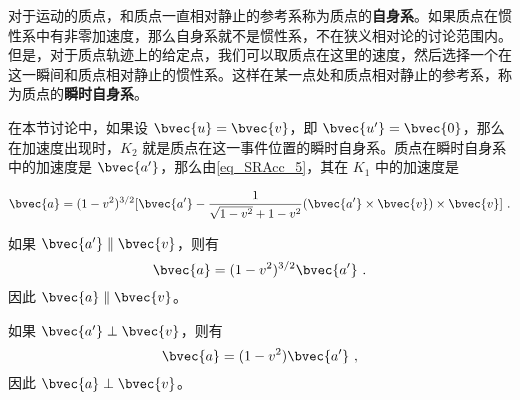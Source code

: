 对于运动的质点，和质点一直相对静止的参考系称为质点的\textbf{自身系}。如果质点在惯性系中有非零加速度，那么自身系就不是惯性系，不在狭义相对论的讨论范围内。但是，对于质点轨迹上的给定点，我们可以取质点在这里的速度，然后选择一个在这一瞬间和质点相对静止的惯性系。这样在某一点处和质点相对静止的参考系，称为质点的\textbf{瞬时自身系}。

在本节讨论中，如果设 $\bvec{u}=\bvec{v}$，即 $\bvec{u'}=\bvec{0}$，那么在加速度出现时，$K_2$ 就是质点在这一事件位置的瞬时自身系。质点在瞬时自身系中的加速度是 $\bvec{a'}$，那么由\autoref{eq_SRAcc_5}，其在 $K_1$ 中的加速度是

\begin{equation}
\bvec{a}=(1-v^2)^{3/2}[\bvec{a'}-\frac{1}{\sqrt{1-v^2}+1-v^2}(\bvec{a'}\times\bvec{v})\times\bvec{v}]~.
\end{equation}

如果 $\bvec{a'}\parallel \bvec{v}$，则有
\begin{equation}
\bvec{a}=(1-v^2)^{3/2}\bvec{a'}~.
\end{equation}
因此 $\bvec{a}\parallel\bvec{v}$。

如果 $\bvec{a'}\perp \bvec{v}$，则有
\begin{equation}
\bvec{a}=(1-v^2)\bvec{a'}~,
\end{equation}
因此 $\bvec{a}\perp\bvec{v}$。


